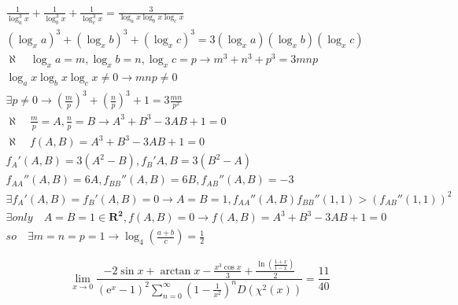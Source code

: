 \documentclass{article}
\begin{document}
\clearpage
\begin{align*}
    \frac{1}{\log_{a}^3x}+\frac{1}{\log_{b}^3x}+\frac{1}{\log_{c}^3x} = \frac{3}{\log_{a}x\log_{b}x\log_{c}x}
    \\ (\log_{x}a)^3+(\log_{x}b)^3+(\log_{x}c)^3 = 3(\log_{x}a)(\log_{x}b)(\log_{x}c)
    \\ \aleph \quad \log_{x}a=m,\log_{x}b=n,\log_{x}c=p \rightarrow m^3+n^3+p^3 = 3mnp
    \\ \log_{a}x\log_{b}x\log_{c}x \neq 0 \longrightarrow mnp \neq 0
    \\ \exists p \neq 0 \rightarrow (\frac{m}{p})^3+(\frac{n}{p})^3+1=3\frac{mn}{p^2}
    \\ \aleph \quad \frac{m}{p}=A,\frac{n}{p} =B \rightarrow A^3+B^3-3AB+1=0
    \\ \aleph \quad f(A,B) = A^3+B^3-3AB+1 = 0 
    \\ f_{A}'(A,B) = 3(A^2-B),f_{B}'{A,B}=3(B^2-A)
    \\ f_{AA}''(A,B)=6A,f_{BB}''(A,B)=6B,f_{AB}''(A,B)=-3
    \\ \exists f_{A}'(A,B)=f_{B}'(A,B) = 0 \longrightarrow A=B=1,f_{AA}''(A,B)f_{BB}''(1,1)>(f_{AB}''(1,1))^2
    \\ \exists only \quad A=B=1 \in \mathbf{R^2},f(A,B)=0 \longrightarrow f(A,B) = A^3+B^3-3AB+1 = 0 
    \\ so \quad \exists m = n = p = 1 \longrightarrow \log_{4}\left(\frac{a+b}{c}\right)=\frac{1}{2} 
\end{align*}

\clearpage

\begin{displaymath}
    \lim_{x \to 0 }\frac{-2\sin x+\arctan x-\frac{x^3 \cos x}{3}+\frac{\ln(\frac{1+x}{1-x})}{2}}{(\mathrm{e}^{x}-1)^2 \sum_{n=0}^{\infty}\left(1-\frac{1}{x^2}\right)^n D(\chi^2(x))} =  \frac{11}{40} 
\end{displaymath}
\end{document}
